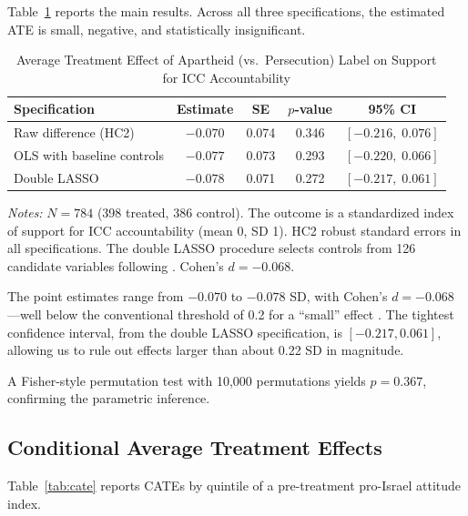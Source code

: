 \documentclass[12pt]{article}
\begin{document}
Table~\ref{tab:main} reports the main results. Across all three specifications, the estimated ATE is small, negative, and statistically insignificant.

\begin{table}[H]
\centering
\begin{threeparttable}
\caption{Average Treatment Effect of Apartheid (vs.\ Persecution) Label on Support for ICC Accountability}
\label{tab:main}
\begin{tabular}{lcccc}
\toprule
Specification & Estimate & SE & $p$-value & 95\% CI \\
\midrule
Raw difference (HC2)       & $-0.070$ & 0.074 & 0.346 & $[-0.216,\; 0.076]$ \\
OLS with baseline controls & $-0.077$ & 0.073 & 0.293 & $[-0.220,\; 0.066]$ \\
Double LASSO               & $-0.078$ & 0.071 & 0.272 & $[-0.217,\; 0.061]$ \\
\bottomrule
\end{tabular}
\begin{tablenotes}
\small
\item \textit{Notes:} $N = 784$ (398 treated, 386 control). The outcome is a standardized index of support for ICC accountability (mean 0, SD 1). HC2 robust standard errors in all specifications. The double LASSO procedure selects controls from 126 candidate variables following \citet{belloni2014inference}. Cohen's $d = -0.068$.
\end{tablenotes}
\end{threeparttable}
\end{table}

The point estimates range from $-0.070$ to $-0.078$ SD, with Cohen's $d = -0.068$---well below the conventional threshold of 0.2 for a ``small'' effect \citep{cohen1988statistical}. The tightest confidence interval, from the double LASSO specification, is $[-0.217, 0.061]$, allowing us to rule out effects larger than about 0.22 SD in magnitude.

A Fisher-style permutation test with 10{,}000 permutations yields $p = 0.367$, confirming the parametric inference.

\subsection{Conditional Average Treatment Effects}

Table~\ref{tab:cate} reports CATEs by quintile of a pre-treatment pro-Israel attitude index.
\end{document}
